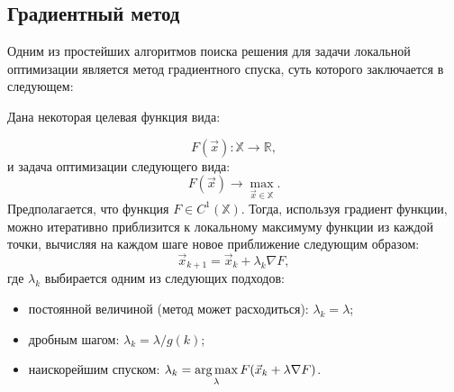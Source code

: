 \subsection{Градиентный метод}
\noindent\indent Одним из простейших алгоритмов поиска решения для задачи локальной
оптимизации является метод градиентного спуска, суть которого заключается в следующем:\par
  Дана некоторая целевая функция вида:\par
\begin{equation}
  F(\vec{x}) : \mathbb{X} \rightarrow \mathbb{R},
\end{equation}
и задача оптимизации следующего вида:
\begin{equation}
  F(\vec{x}) \rightarrow \max\limits_{\vec{x}\in \mathbb{X}}.
\end{equation}
Предполагается, что функция $F \in C^1(\mathbb{X})$. Тогда, используя градиент
функции, можно итеративно приблизится к локальному максимуму функции из каждой точки,
вычисляя на каждом шаге новое приближение следующим образом:
\begin{equation}
  \vec{x}_{k+1} = \vec{x}_{k} + \lambda_{k} \nabla F,
\end{equation}
где $\lambda_{k}$ выбирается одним из следующих подходов:
\begin{itemize}
  \item постоянной величиной (метод может расходиться): $\lambda_{k} = \lambda$;
  \item дробным шагом: $\lambda_{k} = \lambda / g(k)$;
  \item наискорейшим спуском: $\lambda_{k} = \operatorname*{arg\,max}\limits_{\lambda} F(\vec{x}_{k} + \lambda \nabla F)$.
\end{itemize}
